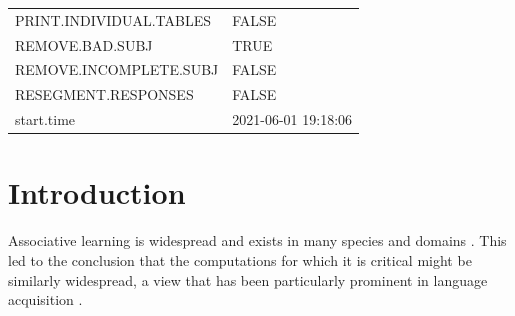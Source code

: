 \documentclass[]{article}
\begin{document}
\begin{longtable}[]{@{}ll@{}}
\begin{minipage}[t]{0.03\columnwidth}\raggedright\strut
PRINT.INDIVIDUAL.TABLES\strut
\end{minipage} & \begin{minipage}[t]{0.92\columnwidth}\raggedright\strut
FALSE\strut
\end{minipage}\tabularnewline
\begin{minipage}[t]{0.03\columnwidth}\raggedright\strut
REMOVE.BAD.SUBJ\strut
\end{minipage} & \begin{minipage}[t]{0.92\columnwidth}\raggedright\strut
TRUE\strut
\end{minipage}\tabularnewline
\begin{minipage}[t]{0.03\columnwidth}\raggedright\strut
REMOVE.INCOMPLETE.SUBJ\strut
\end{minipage} & \begin{minipage}[t]{0.92\columnwidth}\raggedright\strut
FALSE\strut
\end{minipage}\tabularnewline
\begin{minipage}[t]{0.03\columnwidth}\raggedright\strut
RESEGMENT.RESPONSES\strut
\end{minipage} & \begin{minipage}[t]{0.92\columnwidth}\raggedright\strut
FALSE\strut
\end{minipage}\tabularnewline
\begin{minipage}[t]{0.03\columnwidth}\raggedright\strut
start.time\strut
\end{minipage} & \begin{minipage}[t]{0.92\columnwidth}\raggedright\strut
2021-06-01 19:18:06\strut
\end{minipage}\tabularnewline
\bottomrule
\end{longtable}

\clearpage

\section{Introduction}\label{introduction}

Associative learning is widespread and exists in many species and
domains
\citetext{\citealp{Aslin1998}; \citealp{Chen2015}; \citealp[Conway2005a;][]{Fiser2002}; \citealp{Hauser2001}; \citealp{Saffran-Science}; \citealp{Toro2005-backward}; \citealp{Turk-Browne2005}; \citealp{Turk-Browne-reversal}}.
This led to the conclusion that the computations for which it is
critical might be similarly widespread, a view that has been
particularly prominent in language acquisition
\citep{Aslin2012, Seidenberg2002, Thiessen2017}.
\end{document}
